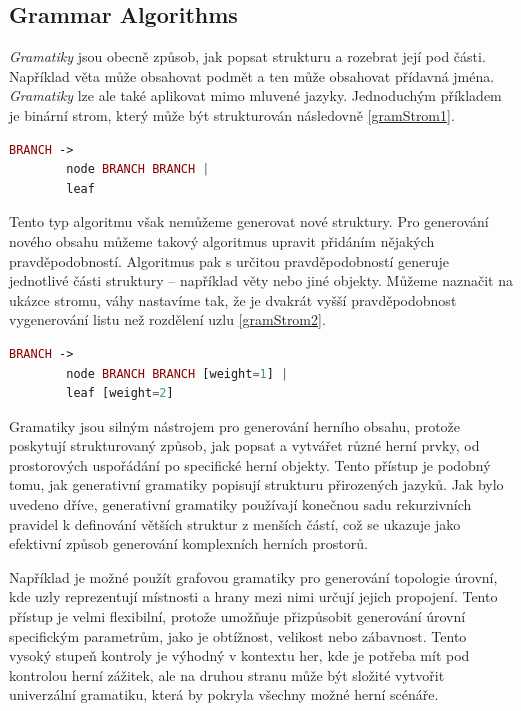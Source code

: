 \subsection{Grammar Algorithms}

\textit{Gramatiky} jsou obecně způsob, jak popsat strukturu a rozebrat její pod části. Například věta může obsahovat podmět a ten může obsahovat přídavná jména. \textit{Gramatiky} lze ale také aplikovat mimo mluvené jazyky. Jednoduchým příkladem je binární strom, který může být strukturován následovně \ref{gramStrom1}. \cite{GramFand} \cite{GramClanek}
\begin{lstlisting}[language=php, caption=Příklad gramatiky: Strom, label=gramStrom1]
    BRANCH ->
        node BRANCH BRANCH |
        leaf
\end{lstlisting}
Tento typ algoritmu však nemůžeme generovat nové struktury. Pro generování nového obsahu můžeme takový algoritmus upravit přidáním nějakých pravděpodobností. Algoritmus pak s určitou pravděpodobností generuje jednotlivé části struktury – například věty nebo jiné objekty. Můžeme naznačit na ukázce stromu, váhy nastavíme tak, že je dvakrát vyšší pravděpodobnost vygenerování listu než rozdělení uzlu \ref{gramStrom2}. \cite{GramClanek}
\begin{lstlisting}[language=php, caption=Příklad gramatiky: Strom s váhami, label=gramStrom2]
    BRANCH ->
        node BRANCH BRANCH [weight=1] |
        leaf [weight=2]
\end{lstlisting}

Gramatiky jsou silným nástrojem pro generování herního obsahu, protože poskytují strukturovaný způsob, jak popsat a vytvářet různé herní prvky, od prostorových uspořádání po specifické herní objekty. Tento přístup je podobný tomu, jak generativní gramatiky popisují strukturu přirozených jazyků. Jak bylo uvedeno dříve, generativní gramatiky používají konečnou sadu rekurzivních pravidel k definování větších struktur z menších částí, což se ukazuje jako efektivní způsob generování komplexních herních prostorů.

Například je možné použít grafovou gramatiky pro generování topologie úrovní, kde uzly reprezentují místnosti a hrany mezi nimi určují jejich propojení. Tento přístup je velmi flexibilní, protože umožňuje přizpůsobit generování úrovní specifickým parametrům, jako je obtížnost, velikost nebo zábavnost. Tento vysoký stupeň kontroly je výhodný v kontextu her, kde je potřeba mít pod kontrolou herní zážitek, ale na druhou stranu může být složité vytvořit univerzální gramatiku, která by pokryla všechny možné herní scénáře.

